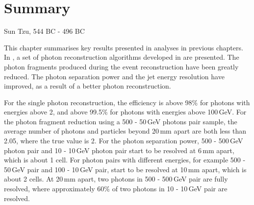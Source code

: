 \chapter{Summary}
\label{chap:summary}



%
{Sun Tzu, 544 BC - 496 BC}




This chapter summarises key results presented in analyses in previous chapters. In , a set of photon reconstruction algorithms developed in \pandora are presented. The photon fragments produced during the event reconstruction have been greatly reduced. The photon separation power and the jet energy resolution have improved, as a result of a better photon reconstruction.

For the single photon reconstruction, the efficiency is above 98\% for photons with energies above 2\GeV, and above 99.5\% for photons with energies above 100\,GeV. For the photon fragment reduction using a  500 - 50\,GeV photons pair sample, the average number of photons and particles beyond 20\,mm apart are both less than 2.05, where the true value is 2. For the photon separation power, 500 - 500\,GeV photon pair and 10 - 10\,GeV photon pair start to be resolved at 6\,mm apart, which is about 1 \ECAL cell. For photon pairs with different energies,  for example 500 - 50\,GeV pair and  100 - 10\,GeV pair, start to be resolved at 10\,mm apart, which is about 2 \ECAL cells. At 20\,mm apart, two photons in  500 - 500\,GeV pair are fully resolved, where approximately 60\% of two photons in 10 - 10\,GeV pair are resolved.

